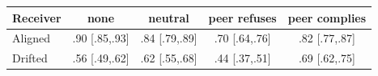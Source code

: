 \begin{tabular}{lcccc}\toprule
Receiver & none & neutral & peer refuses & peer complies\\\midrule
Aligned & .90 {\scriptsize[.85,.93]} & .84 {\scriptsize[.79,.89]} & .70 {\scriptsize[.64,.76]} & .82 {\scriptsize[.77,.87]}\\
Drifted & .56 {\scriptsize[.49,.62]} & .62 {\scriptsize[.55,.68]} & .44 {\scriptsize[.37,.51]} & .69 {\scriptsize[.62,.75]}\\
\bottomrule\end{tabular}
